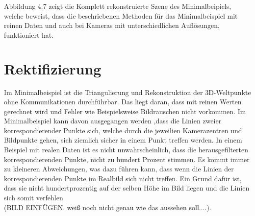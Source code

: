 Abbildung 4.7 zeigt die Komplett rekonstruierte Szene des Minimalbeipiels, welche beweist, dass die beschriebenen Methoden für das Minimalbeispiel mit reinen Daten und auch bei Kameras mit unterschiedlichen Auflösungen, funktioniert hat. 
\pagebreak
\section{Rektifizierung}




Im Minimalbeispiel ist die Triangulierung und Rekonstruktion der 3D-Weltpunkte ohne Kommunikationen durchführbar. Das liegt daran, dass mit reinen Werten gerechnet wird und Fehler wie Beispielsweise Bildrauschen nicht vorkommen. Im Minimalbeispiel kann davon ausgegangen werden ,dass die Linien zweier korrespondierender Punkte sich, welche durch die jeweilien Kamerazentren und Bildpunkte gehen, sich ziemlich sicher in einem Punkt treffen werden. In einem Beispiel mit realen Daten ist es nicht unwahrscheinlich, dass die herausgefilterten korrespondierenden Punkte, nicht zu hundert Prozent stimmen. Es kommt immer zu kleineren Abweichungen, was dazu führen kann, dass wenn die Linien der korrespondierenden Punkte im Realbild sich nicht treffen. Ein Grund dafür ist, dass sie nicht hundertprozentig auf der selben Höhe im Bild liegen und die Linien sich somit verfehlen\\



 (BILD EINFÜGEN. weiß noch nicht genau wie das aussehen soll....).\\





